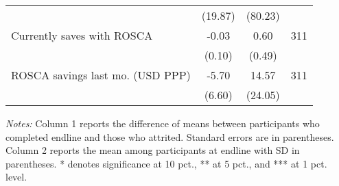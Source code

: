 \begin{table}[h]
{\begin{threeparttable}
\begin{tabular}{l*{3}{c}}
          &  (19.87)&  (80.23)&         \\
Currently saves with ROSCA&    -0.03&     0.60&      311\\
          &   (0.10)&   (0.49)&         \\
ROSCA savings last mo. (USD PPP)&    -5.70&    14.57&      311\\
          &   (6.60)&  (24.05)&         \\
\bottomrule \end{tabular} \begin{tablenotes}[flushleft] \footnotesize \item \emph{Notes:} Column 1 reports the difference of means between participants who completed endline and those who attrited. Standard errors are in parentheses. Column 2 reports the mean among participants at endline with SD in parentheses. * denotes significance at 10 pct., ** at 5 pct., and *** at 1 pct. level. \end{tablenotes} \end{threeparttable} } \end{table}

